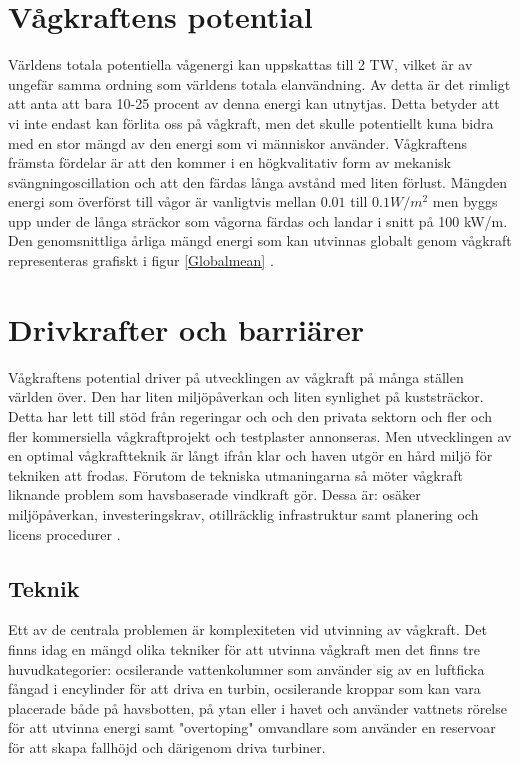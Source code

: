 \documentclass[10pt,a4paper,oneside]{article}
\begin{document}
\section{Vågkraftens potential}
Världens totala potentiella vågenergi kan uppskattas till 2 TW, vilket är av ungefär samma ordning som världens totala elanvändning. Av detta är det rimligt att anta att bara 10-25 procent av denna energi kan utnytjas. Detta betyder att vi inte endast kan förlita oss på vågkraft, men det skulle potentiellt kuna bidra med en stor mängd av den energi som vi människor använder. Vågkraftens främsta fördelar är att den kommer i en högkvalitativ form av mekanisk svängningoscillation och att den färdas långa avstånd med liten förlust. Mängden energi som överförst till vågor är vanligtvis mellan \begin{math} 0.01  \end{math} till \begin{math} 0.1 W/m^2 \end{math} men byggs upp under de långa sträckor som vågorna färdas och landar i snitt på 100 kW/m. Den genomsnittliga årliga mängd energi som kan utvinnas globalt genom vågkraft representeras grafiskt i figur \ref{Globalmean} \citep{Cruz}. 

\section{Drivkrafter och barriärer}
Vågkraftens potential driver på utvecklingen av vågkraft på många ställen världen över. Den har liten miljöpåverkan och liten synlighet på kuststräckor. Detta har lett till stöd från regeringar och och den privata sektorn och fler och fler kommersiella vågkraftprojekt och testplaster annonseras. Men utvecklingen av en optimal vågkraftteknik är långt ifrån klar och haven utgör en hård miljö för tekniken att frodas. Förutom de tekniska utmaningarna så möter vågkraft liknande problem som havsbaserade vindkraft gör. Dessa är: osäker miljöpåverkan, investeringskrav, otillräcklig infrastruktur samt planering och licens procedurer \cite{IRENA}.

\subsection{Teknik}
Ett av de centrala problemen är komplexiteten vid utvinning av vågkraft. Det finns idag en mängd olika tekniker för att utvinna vågkraft men det finns tre huvudkategorier:  ocsilerande vattenkolumner som använder sig av en luftficka fångad i encylinder för att driva en turbin, ocsilerande kroppar som kan vara placerade både på havsbotten, på ytan eller i havet och använder vattnets rörelse för att utvinna energi samt "overtoping" omvandlare som använder en reservoar för att skapa fallhöjd och därigenom driva turbiner.
\end{document}
